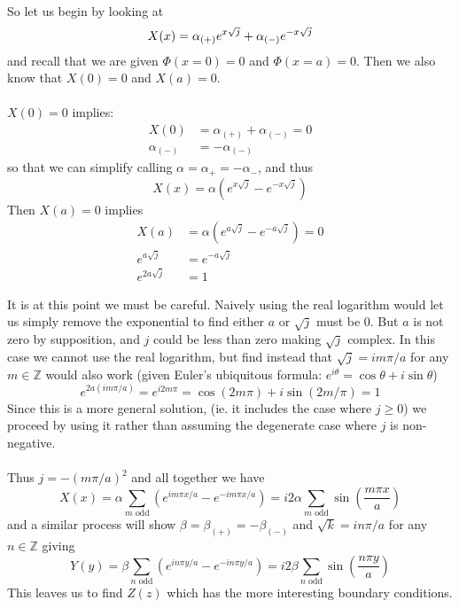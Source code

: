 \documentclass{article}
\begin{document}
\paragraph{}
So let us begin by looking at
\[ X(x) = \alpha_{(+)}e^{x\sqrt{j}}+\alpha_{(-)}e^{-x\sqrt{j}}\\ \]
and recall that we are given $\Phi(x=0)=0$ and $\Phi(x=a)=0$. Then we also know that $X(0)=0$ and $X(a)=0$.\\
\\
$X(0)=0$ implies:
\begin{align*}
X(0) &= \alpha_{(+)} + \alpha_{(-)} = 0\\
\alpha_{(-)} &= -\alpha_{(-)}
\end{align*}
so that we can simplify calling $\alpha = \alpha_{+} = -\alpha_{-}$, and thus
\[ X(x) = \alpha \left( e^{x\sqrt{j}} - e^{-x\sqrt{j}} \right) \]
Then $X(a)=0$ implies
\begin{align*}
X(a) &= \alpha \left( e^{a\sqrt{j}} - e^{-a\sqrt{j}} \right) = 0\\
e^{a\sqrt{j}} &= e^{-a\sqrt{j}}\\
e^{2a\sqrt{j}} &= 1
\end{align*}

It is at this point we must be careful. Naively using the real logarithm would let us simply remove the exponential to find either $a$ or $\sqrt{j}$ must be 0. But $a$ is not zero by supposition, and $j$ could be less than zero making $\sqrt{j}$ complex. In this case we cannot use the real logarithm, but find instead that $\sqrt{j} = im\pi/a$ for any $m\in\mathbb{Z}$ would also work (given Euler's ubiquitous formula: $e^{i\theta} = \cos\theta + i\sin\theta$)
\[ e^{2a(im\pi/a)} = e^{i2m\pi} = \cos(2m\pi)+ i\sin(2m/\pi) = 1 \]
Since this is a more general solution, (ie. it includes the case where $j\ge 0$) we proceed by using it rather than assuming the degenerate case where $j$ is non-negative.\\
\\
Thus $j=-(m\pi/a)^{2}$ and all together we have
\[ X(x) = \alpha \sum_{m \text{ odd}}\left( e^{im\pi x/a} - e^{-im\pi x/a} \right) = i2\alpha \sum_{m \text{ odd}}\sin\left(\frac{ m\pi x }{ a }\right) \]
and a similar process will show $\beta=\beta_{(+)}=-\beta_{(-)}$ and $\sqrt{k} = in\pi/a$ for any $n\in\mathbb{Z}$ giving
\[ Y(y) = \beta \sum_{n \text{ odd}}\left( e^{in\pi y/a} - e^{-in\pi y/a} \right) = i2\beta \sum_{n \text{ odd}}\sin\left(\frac{ n\pi y }{ a }\right) \]
This leaves us to find $Z(z)$ which has the more interesting boundary conditions.
\end{document}
